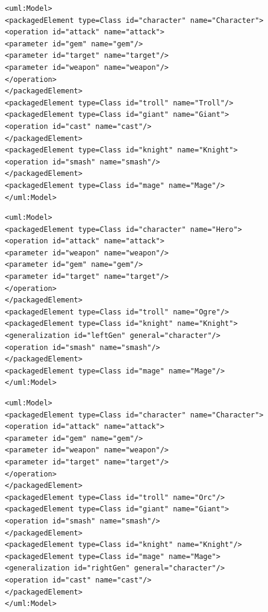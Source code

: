 \vspace{-20pt}
\begin{lstlisting}[style=xmi,caption={Simplified XMI file of the original version in Figure \ref{fig:class_diagram_origin}.},label=lst:xmimodel_origin]
<uml:Model>
<packagedElement type=Class id="character" name="Character">
<operation id="attack" name="attack">
<parameter id="gem" name="gem"/>
<parameter id="target" name="target"/>
<parameter id="weapon" name="weapon"/>
</operation>
</packagedElement>
<packagedElement type=Class id="troll" name="Troll"/>
<packagedElement type=Class id="giant" name="Giant">
<operation id="cast" name="cast"/>
</packagedElement>
<packagedElement type=Class id="knight" name="Knight">
<operation id="smash" name="smash"/>
</packagedElement>
<packagedElement type=Class id="mage" name="Mage"/>
</uml:Model>
\end{lstlisting}

\vspace{-20pt}
\begin{lstlisting}[style=xmi,caption={Simplified XMI file of the left version in Figure \ref{fig:class_diagram_left}.},label=lst:xmimodel_left]
<uml:Model>
<packagedElement type=Class id="character" name="Hero">
<operation id="attack" name="attack">
<parameter id="weapon" name="weapon"/>
<parameter id="gem" name="gem"/>
<parameter id="target" name="target"/>
</operation>  
</packagedElement>
<packagedElement type=Class id="troll" name="Ogre"/>
<packagedElement type=Class id="knight" name="Knight">
<generalization id="leftGen" general="character"/>
<operation id="smash" name="smash"/>
</packagedElement>
<packagedElement type=Class id="mage" name="Mage"/>
</uml:Model>
\end{lstlisting}

\vspace{-20pt}
\begin{lstlisting}[style=xmi,caption={Simplified XMI file of the right version of Figure \ref{fig:class_diagram_right}.},label=lst:xmimodel_right]
<uml:Model>
<packagedElement type=Class id="character" name="Character">
<operation id="attack" name="attack">
<parameter id="gem" name="gem"/>
<parameter id="weapon" name="weapon"/>
<parameter id="target" name="target"/>
</operation>
</packagedElement>
<packagedElement type=Class id="troll" name="Orc"/>
<packagedElement type=Class id="giant" name="Giant">
<operation id="smash" name="smash"/>
</packagedElement>
<packagedElement type=Class id="knight" name="Knight"/>
<packagedElement type=Class id="mage" name="Mage">
<generalization id="rightGen" general="character"/>
<operation id="cast" name="cast"/>
</packagedElement>
</uml:Model>
\end{lstlisting}

